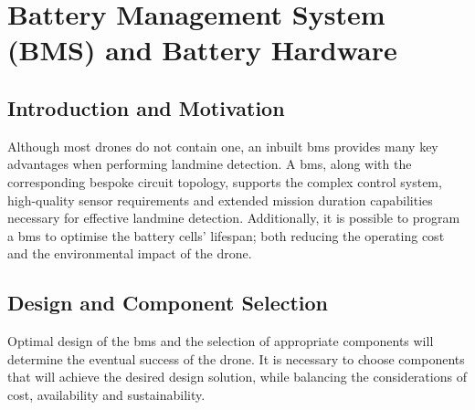 


\section{Battery Management System (BMS) and Battery Hardware}
\label{sec:bms}
\subsection{Introduction and Motivation}

Although most drones do not contain one, an inbuilt \acrshort{bms} \cite{SON2023120186} provides many key advantages when performing landmine detection. A \acrshort{bms}, along with the corresponding bespoke circuit topology, supports the complex control system, high-quality sensor requirements and extended mission duration capabilities necessary for effective landmine detection. Additionally, it is possible to program a \acrshort{bms} to optimise the battery cells’ lifespan; both reducing the operating cost and the environmental impact of the drone.

\subsection{Design and Component Selection}

Optimal design of the \acrshort{bms} and the selection of appropriate components will determine the eventual success of the drone. It is necessary to choose components that will achieve the desired design solution, while balancing the considerations of cost, availability and sustainability.


